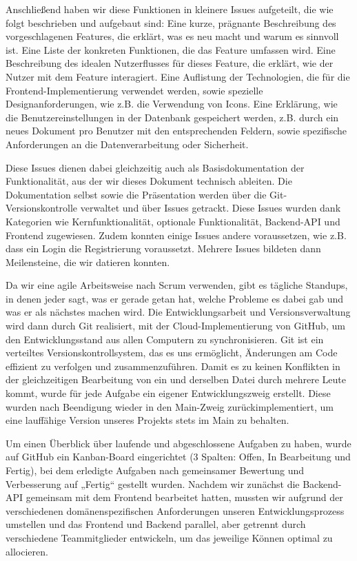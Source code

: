 \documentclass[a4paper,12pt]{article}
\begin{document}
Anschließend haben wir diese Funktionen in kleinere Issues aufgeteilt, die wie folgt beschrieben und aufgebaut sind: Eine kurze, prägnante Beschreibung des vorgeschlagenen Features, die erklärt, was es neu macht und warum es sinnvoll ist. Eine Liste der konkreten Funktionen, die das Feature umfassen wird. Eine Beschreibung des idealen Nutzerflusses für dieses Feature, die erklärt, wie der Nutzer mit dem Feature interagiert. Eine Auflistung der Technologien, die für die Frontend-Implementierung verwendet werden, sowie spezielle Designanforderungen, wie z.B. die Verwendung von Icons. Eine Erklärung, wie die Benutzereinstellungen in der Datenbank gespeichert werden, z.B. durch ein neues Dokument pro Benutzer mit den entsprechenden Feldern, sowie spezifische Anforderungen an die Datenverarbeitung oder Sicherheit.

Diese Issues dienen dabei gleichzeitig auch als Basisdokumentation der Funktionalität, aus der wir dieses Dokument technisch ableiten. Die Dokumentation selbst sowie die Präsentation werden über die Git-Versionskontrolle verwaltet und über Issues getrackt. Diese Issues wurden dank Kategorien wie Kernfunktionalität, optionale Funktionalität, Backend-API und Frontend zugewiesen. Zudem konnten einige Issues andere voraussetzen, wie z.B. dass ein Login die Registrierung voraussetzt. Mehrere Issues bildeten dann Meilensteine, die wir datieren konnten.

Da wir eine agile Arbeitsweise nach Scrum verwenden, gibt es tägliche Standups, in denen jeder sagt, was er gerade getan hat, welche Probleme es dabei gab und was er als nächstes machen wird. Die Entwicklungsarbeit und Versionsverwaltung wird dann durch Git realisiert, mit der Cloud-Implementierung von GitHub, um den Entwicklungsstand aus allen Computern zu synchronisieren. Git ist ein verteiltes Versionskontrollsystem, das es uns ermöglicht, Änderungen am Code effizient zu verfolgen und zusammenzuführen. Damit es zu keinen Konflikten in der gleichzeitigen Bearbeitung von ein und derselben Datei durch mehrere Leute kommt, wurde für jede Aufgabe ein eigener Entwicklungszweig erstellt. Diese wurden nach Beendigung wieder in den Main-Zweig zurückimplementiert, um eine lauffähige Version unseres Projekts stets im Main zu behalten.

Um einen Überblick über laufende und abgeschlossene Aufgaben zu haben, wurde auf GitHub ein Kanban-Board eingerichtet (3 Spalten: Offen, In Bearbeitung und Fertig), bei dem erledigte Aufgaben nach gemeinsamer Bewertung und Verbesserung auf „Fertig“ gestellt wurden. Nachdem wir zunächst die Backend-API gemeinsam mit dem Frontend bearbeitet hatten, mussten wir aufgrund der verschiedenen domänenspezifischen Anforderungen unseren Entwicklungsprozess umstellen und das Frontend und Backend parallel, aber getrennt durch verschiedene Teammitglieder entwickeln, um das jeweilige Können optimal zu allocieren.
\end{document}
